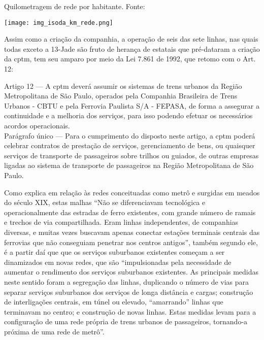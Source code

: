 \documentclass[11pt,fleqn]{book} %
\begin{document}
\begin{table}[h]
	\caption{Quilometragem de rede por habitante. Fonte: \cite[p. 58]{Isoda}}
	\texttt{[image: img\_isoda\_km\_rede.png]}
	\label{tab:isoda_km}
\end{table}

Assim como a criação da companhia, a operação de seis das sete linhas, nas quais todas exceto a 13-Jade são fruto de herança de estatais que pré-dataram a criação da {\glsdesc*{cptm}}, tem seu amparo por meio da Lei 7.861 de 1992, que retomo com o Art. 12:

\begin{citacao}
	Artigo 12 --- A \gls{cptm} deverá assumir os sistemas de trens urbanos da Região Metropolitana de São Paulo, operados pela Companhia Brasileira de Trens Urbanos - CBTU e pela Ferrovia Paulista S/A - FEPASA, de forma a assegurar a continuidade e a melhoria dos serviços, para isso podendo efetuar os necessários acordos operacionais.\\
	Parágrafo único --- Para o cumprimento do disposto neste artigo, a \gls{cptm} poderá celebrar contratos de prestação de serviços, gerenciamento de bens, ou quaisquer serviços de transporte de passageiros sobre trilhos ou guiados, de outras empresas ligadas ao sistema de transporte de passageiros na Região Metropolitana de São Paulo.\cite{lei7861}
\end{citacao}

Como explica \cite[pág. 30]{Isoda} em relação às redes conceituadas como metrô e surgidas em meados do século XIX, estas malhas ``Não se diferenciavam tecnológica e operacionalmente das estradas de ferro  existentes,  com  grande  número  de  ramais  e  trechos  de  via compartilhada. Eram linhas independentes, de companhias diversas, e muitas  vezes  buscavam  apenas  conectar  estações  terminais  centrais das ferrovias que não conseguiam penetrar nos centros antigos'', também segundo ele, é a partir daí que que os serviços suburbanos existentes começam a ser dinamizados em novas redes, que são ``impulsionadas  pela  necessidade  de  aumentar  o  rendimento  dos serviços  suburbanos  existentes.  As  principais  medidas  neste  sentido foram  a  segregação  das  linhas,  duplicando  o  número  de  vias  para separar serviços suburbanos dos serviços de longa distância e  cargas; construção  de  interligações  centrais,  em  túnel  ou  elevado, “amarrando” linhas que terminavam no centro; e construção de novas linhas. Estas medidas levam para a configuração de uma rede própria de trens urbanos de passageiros, tornando-a próxima de uma rede de metrô''\cite[pág. 32]{Isoda}.
	
\end{document}
